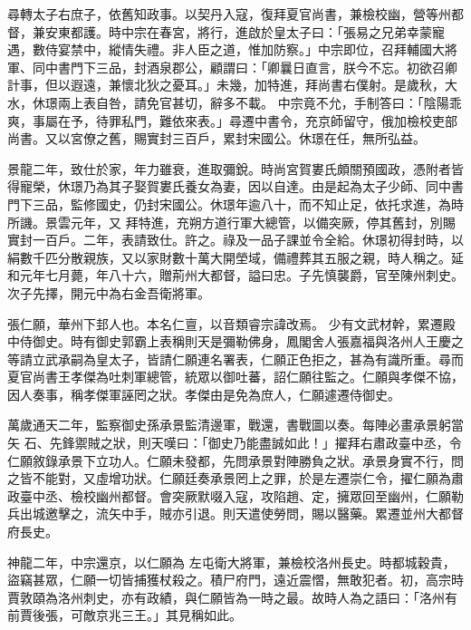 \begin{pinyinscope}
 尋轉太子右庶子，依舊知政事。以契丹入寇，復拜夏官尚書，兼檢校幽，營等州都督，兼安東都護。時中宗在春宮，將行，進啟於皇太子曰：「張易之兄弟幸蒙寵遇，數侍宴禁中，縱情失禮。非人臣之道，惟加防察。」中宗即位，召拜輔國大將軍、同中書門下三品，封酒泉郡公，顧謂曰：「卿曩日直言，朕今不忘。初欲召卿計事，但以遐遠，兼懷北狄之憂耳。」未幾，加特進，拜尚書右僕射。是歲秋，大水，休璟兩上表自咎，請免官甚切，辭多不載。
 中宗竟不允，手制答曰：「陰陽乖爽，事屬在予，待罪私門，難依來表。」尋遷中書令，充京師留守，俄加檢校吏部尚書。又以宮僚之舊，賜實封三百戶，累封宋國公。休璟在任，無所弘益。



 景龍二年，致仕於家，年力雖衰，進取彌銳。時尚宮賀婁氏頗關預國政，憑附者皆得寵榮，休璟乃為其子娶賀婁氏養女為妻，因以自達。由是起為太子少師、同中書門下三品，監修國史，仍封宋國公。休璟年逾八十，而不知止足，依托求進，為時所譏。景雲元年，又
 拜特進，充朔方道行軍大總管，以備突厥，停其舊封，別賜實封一百戶。二年，表請致仕。許之。祿及一品子課並令全給。休璟初得封時，以絹數千匹分散親族，又以家財數十萬大開塋域，備禮葬其五服之親，時人稱之。延和元年七月薨，年八十六，贈荊州大都督，謚曰忠。子先慎襲爵，官至陳州刺史。次子先擇，開元中為右金吾衛將軍。



 張仁願，華州下邽人也。本名仁亶，以音類睿宗諱改焉。
 少有文武材幹，累遷殿中侍御史。時有御史郭霸上表稱則天是彌勒佛身，鳳閣舍人張嘉福與洛州人王慶之等請立武承嗣為皇太子，皆請仁願連名署表，仁願正色拒之，甚為有識所重。尋而夏官尚書王孝傑為吐刺軍總管，統眾以御吐蕃，詔仁願往監之。仁願與孝傑不協，因人奏事，稱孝傑軍誣罔之狀。孝傑由是免為庶人，仁願遽遷侍御史。



 萬歲通天二年，監察御史孫承景監清邊軍，戰還，書戰圖以奏。每陣必畫承景躬當矢
 石、先鋒禦賊之狀，則天嘆曰：「御史乃能盡誠如此！」擢拜右肅政臺中丞，令仁願敘錄承景下立功人。仁願未發都，先問承景對陣勝負之狀。承景身實不行，問之皆不能對，又虛增功狀。仁願廷奏承景罔上之罪，於是左遷崇仁令，擢仁願為肅政臺中丞、檢校幽州都督。會突厥默啜入寇，攻陷趙、定，擁眾回至幽州，仁願勒兵出城邀擊之，流矢中手，賊亦引退。則天遣使勞問，賜以醫藥。累遷並州大都督府長史。



 神龍二年，中宗還京，以仁願為
 左屯衛大將軍，兼檢校洛州長史。時都城穀貴，盜竊甚眾，仁願一切皆捕獲杖殺之。積尸府門，遠近震慴，無敢犯者。初，高宗時賈敦頤為洛州刺史，亦有政績，與仁願皆為一時之最。故時人為之語曰：「洛州有前賈後張，可敵京兆三王。」其見稱如此。




\end{pinyinscope}
